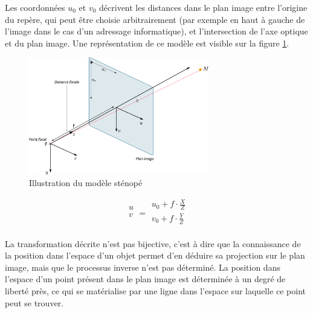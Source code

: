 Les coordonnées $u_0$ et $v_0$ décrivent les distances dans le plan image entre l'origine du repère, qui peut être choisie arbitrairement (par exemple en haut à gauche de l'image dans le cas d'un adressage informatique), et l'intersection de l'axe optique et du plan image. Une représentation de ce modèle est visible sur la figure \ref{fig:ch2_modèle_sténopé}.

\begin{figure}[h]
	\begin{center}
		\includegraphics[width=0.7\textwidth]{Chapter2/graphics/pinhole_model.png}
		\caption{Illustration du modèle sténopé}
		\label{fig:ch2_modèle_sténopé}
	\end{center}
\end{figure}

\begin{equation} \label{eq:ch2_modèle_sténopé}
	\begin{array}{|c}
		u\\
		v\\
	\end{array}
= 
	\begin{array}{|c}
		u_0 + f \cdot \frac{X}{Z}\\
		v_0 + f \cdot \frac{Y}{Z}\\
	\end{array}
\end{equation}

La transformation décrite n'est pas bijective, c'est à dire que la connaissance de la position dans l'espace d'un objet permet d'en déduire sa projection sur le plan image, mais que le processus inverse n'est pas déterminé. La position dans l'espace d'un point présent dans le plan image est déterminée à un degré de liberté près, ce qui se matérialise par une ligne dans l'espace sur laquelle ce point peut se trouver.\\

